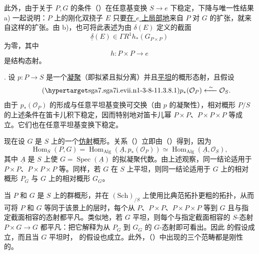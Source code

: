 此外，由于关于 $P,G$ 的条件（）在任意基变换 $S\longrightarrow e$ 下稳定，下降与唯一性结果  a) 一起说明：$P$ 上的刚化双挠子 $E$ 只要\underline{在 $e$ 上局部地}来自 $P$ 对 $G$ 的扩张，就来自这样的扩张。由  b)，也可将此表述为由 $\delta(E)$ 定义的截面
\begin{equation*}
 \underline{\delta}(E)\in\Gamma R^1h_*(G_{P\times P})
\end{equation*}
为零，其中
\begin{equation*}
 h:P\times P\longrightarrow e
\end{equation*}
是结构态射。




. 设 $p:P\longrightarrow S$ 是一个\underline{凝聚}（即拟紧且拟分离）并且\underline{平坦}的概形态射，且假设
\begin{equation}\tag{\SGARefTarget{sga7.sga7i.evii.n1-3-8-1}{1.3.8.1}}
 p_*(\mathcal O_P)\xleftarrow{\ \sim\ }\mathcal O_S.
\end{equation}
由于 $p_*(\mathcal O_P)$ 的形成与任意平坦基变换可交换（由 $p$ 的凝聚性），相对概形 $P/S$ 的上述条件在笛卡儿积下稳定，因而特别地对笛卡儿幂 $P\times P$、$P\times P\times P$ 等成立。它们也在任意平坦基变换下稳定。

现在设 $G$ 是 $S$ 上的一个\underline{仿射}概形。关系（）立即由（）得到，因为
\[
 \operatorname{Hom}_S(P,G)
 =\operatorname{Hom}_{\mathrm{Alg}}(\underline A,p_*(\mathcal O_P))
 \simeq\operatorname{Hom}_{\mathrm{Alg}}(\underline A,\mathcal O_S),
\]
其中 $\underline A$ 是 $S$ 上使 $G=\operatorname{Spec}(\underline A)$ 的拟凝聚代数。由上述观察，同一结论适用于 $P\times P$、$P\times P\times P$ 等。同样，若 $G$ 在 $S$ 上平坦，则同一结论适用于 $G$ 上的相对概形 $P_G$ 与 $G$ 上的相对概形 $G_G$。

当 $P$ 和 $G$ 是 $S$ 上的群概形，并在 $(\mathrm{Sch})_{/S}$ 上使用比典范拓扑更粗的拓扑，从而可将 $P$ 和 $G$ 等同于该景上的层时，每个从 $P$、$P\times P$、$P\times P\times P$ 等到 $G$ 且与指定截面相容的态射都平凡。类似地，若 $G$ 平坦，则每个与指定截面相容的 $S$-态射 $P\times G\longrightarrow G$ 都平凡：把它解释为从 $P_G$ 到 $G_G$ 的 $G$-态射即可看出。因此  的假设成立，而且当 $G$ 平坦时， 的假设也成立。此外，（）中出现的三个范畴都是刚性的。

